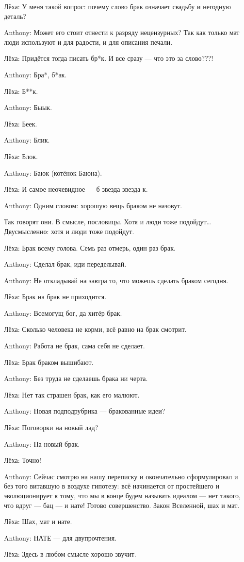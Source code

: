 \begin{miamalist}
  \item[Лёха:] У меня такой вопрос: почему слово брак означает свадьбу и негодную деталь?
  \item[Anthony:] Может его стоит отнести к разряду нецензурных? Так как только мат люди используют и для радости, и для описания печали. %
  \item[Лёха:] Придётся тогда писать бр*к. И все сразу --- что это за слово???!
  \item[Anthony:] Бра*, б*ак.
  \item[Лёха:] Б**к.
  \item[Anthony:] Быык. %
  \item[Лёха:] Беек.
  \item[Anthony:] Блик.
  \item[Лёха:] Блок.
  \item[Anthony:] Баюк (котёнок Баюна).
  \item[Лёха:] И самое неочевидное --- б-звезда-звезда-к.
  \item[Anthony:] Одним словом: хорошую вещь браком не назовут. %
  \item[\hphantom{Anthony:}] Так говорят они. В смысле, пословицы. Хотя и люди тоже подойдут\ldots Двусмысленно: хотя и люди тоже подойдут.
  \item[Лёха:] Брак всему голова. Семь раз отмерь, один раз брак.
  \item[Anthony:] Сделал брак, иди переделывай.
  \item[Anthony:] Не откладывай на завтра то, что можешь сделать браком сегодня.
  \item[Лёха:] Брак на брак не приходится.
  \item[Anthony:] Всемогущ бог, да хитёр брак.
  \item[Лёха:] Сколько человека не корми, всё равно на брак смотрит.
  \item[Anthony:] Работа не брак, сама себя не сделает.
  \item[Лёха:] Брак браком вышибают.
  \item[Anthony:] Без труда не сделаешь брака ни черта.
  \item[Лёха:] Нет так страшен брак, как его малюют.
  \item[Anthony:] Новая подподрубрика --- бракованные идеи?
  \item[Лёха:] Поговорки на новый лад?
  \item[Anthony:] На новый брак.
  \item[Лёха:] Точно!
  \item[Anthony:] Сейчас смотрю на нашу переписку и окончательно сформулировал и без того витавшую в воздухе гипотезу: всё начинается от простейшего и эволюционирует к тому, что мы в конце будем называть идеалом --- нет такого, что вдруг --- бац --- и нате! Готово совершенство. Закон Вселенной, шах и мат.
  \item[Лёха:] Шах, мат и нате.
  \item[Anthony:] НАТЕ --- для двупрочтения. %
  \item[Лёха:] Здесь в любом смысле хорошо звучит.
\end{miamalist}

